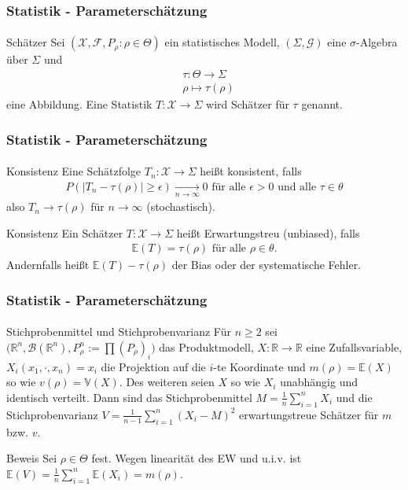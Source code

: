 \documentclass{beamer}
\begin{document}
\begin{frame}
    \frametitle{Statistik - Parameterschätzung}
\framesubtitle{}

\begin{block}{Schätzer}
Sei   $(\mathcal{X}, \mathcal{F}, P_\rho :  \rho \in \Theta)$ ein statistisches Modell, $(\Sigma, \mathcal{G})$ eine $\sigma$-Algebra über $\Sigma$ und  
\begin{align*}
& \tau : \Theta \to \Sigma \\
 & \rho \mapsto \tau(\rho) 
\end{align*}
eine Abbildung. Eine Statistik   $T: \mathcal{X} \to \Sigma$  wird Schätzer für $\tau$ genannt.
\end{block}
 \end{frame}


\begin{frame}
    \frametitle{Statistik - Parameterschätzung}
\framesubtitle{}

\begin{block}{Konsistenz}
Eine Schätzfolge $T_n: \mathcal{X} \to \Sigma$  heißt konsistent, falls
\begin{align*}
P( |T_n - \tau(\rho)  |  \geq \epsilon)  \underset {n \to \infty}{\longrightarrow} 0 \text{ für alle } \epsilon > 0 \text { und alle } \tau \in \theta  
\end{align*}
also $T_n \to \tau(\rho)$ für $n \to \infty$  (stochastisch).
\end{block}
\begin{block}{Konsistenz}
Ein Schätzer $T: \mathcal{X} \to \Sigma$  heißt Erwartungstreu (unbiased), falls
\begin{align*}
\mathbb{E}(T) = \tau(\rho) \text{ für alle } \rho \in \theta.
\end{align*}
Andernfalls heißt $\mathbb{E}(T) - \tau(\rho) $ der Bias oder der systematische Fehler.
\end{block}
 \end{frame}

\begin{frame}
    \frametitle{Statistik - Parameterschätzung}
\framesubtitle{}
\begin{block}{Stichprobenmittel und  Stichprobenvarianz}
Für $n \geq 2$ sei  $\biggl ( \mathbb{R}^n, \mathcal{B}(\mathbb{R}^n ), P^n_\rho :=  \prod (P_\rho)_i \biggr)$ das Produktmodell,  $X: \mathbb{R \to \mathbb{R}}$ eine Zufallsvariable, $X_i(x_1, \cdot ,x_n) = x_i$ die Projektion auf die $i$-te Koordinate  und $m(\rho) = \mathbb{E}(X) $ so wie $v(\rho) =\mathbb{V}(X)$. Des weiteren seien  $X$ so wie $X_i$  unabhängig und identisch verteilt. Dann sind das Stichprobenmittel $M= \frac{1}{n} \sum_{i=1}^n X_i$ und die Stichprobenvarianz
 $V= \frac{1}{n-1} \sum_{i=1}^n (X_i - M)^2$ erwartungstreue Schätzer für $m$ bzw. $v$.
\end{block}

\begin{block}{Beweis}
Sei $\rho \in \Theta$ fest. Wegen linearität des EW und u.i.v. ist $\mathbb{E}(V) =\frac{1}{n} \sum_{i=1}^n \mathbb{E}(X_i) = m(\rho) $.
\end{block}


 \end{frame}
\end{document}
